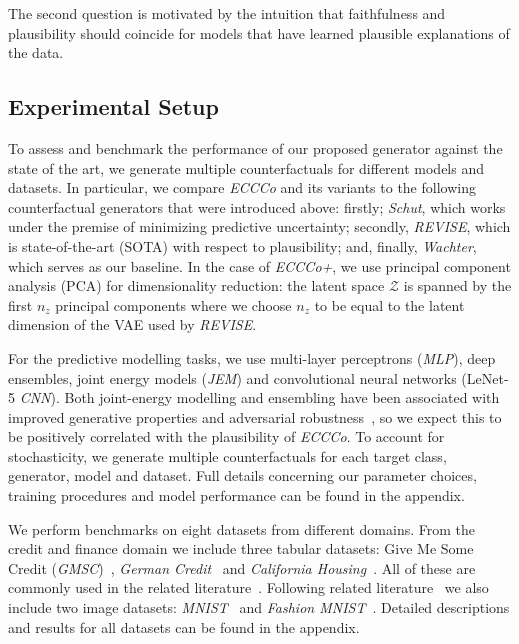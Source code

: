 The second question is motivated by the intuition that faithfulness and plausibility should coincide for models that have learned plausible explanations of the data.

\subsection{Experimental Setup}\label{emp:setup}

To assess and benchmark the performance of our proposed generator against the state of the art, we generate multiple counterfactuals for different models and datasets. In particular, we compare \textit{ECCCo} and its variants to the following counterfactual generators that were introduced above: firstly; \textit{Schut}, which works under the premise of minimizing predictive uncertainty; secondly, \textit{REVISE}, which is state-of-the-art (SOTA) with respect to plausibility; and, finally, \textit{Wachter}, which serves as our baseline. In the case of \textit{ECCCo+}, we use principal component analysis (PCA) for dimensionality reduction: the latent space $\mathcal{Z}$ is spanned by the first $n_z$ principal components where we choose $n_z$ to be equal to the latent dimension of the VAE used by \textit{REVISE}.

For the predictive modelling tasks, we use multi-layer perceptrons (\textit{MLP}), deep ensembles, joint energy models (\textit{JEM}) and convolutional neural networks (LeNet-5 \textit{CNN}). Both joint-energy modelling and ensembling have been associated with improved generative properties and adversarial robustness~\citep{grathwohl2020your,lakshminarayanan2016simple}, so we expect this to be positively correlated with the plausibility of \textit{ECCCo}. To account for stochasticity, we generate multiple counterfactuals for each target class, generator, model and dataset. Full details concerning our parameter choices, training procedures and model performance can be found in the appendix.

We perform benchmarks on eight datasets from different domains. From the credit and finance domain we include three tabular datasets: Give Me Some Credit (\textit{GMSC})~\citep{kaggle2011give}, \textit{German Credit}~\citet{hoffman1994german} and \textit{California Housing}~\citet{pace1997sparse}. All of these are commonly used in the related literature~\citep{karimi2020survey,altmeyer2023endogenous,pawelczyk2021carla}. Following related literature~\citep{schut2021generating,dhurandhar2018explanations} we also include two image datasets: \textit{MNIST}~\citep{lecun1998mnist} and \textit{Fashion MNIST}~\citep{xiao2017fashion}. Detailed descriptions and results for all datasets can be found in the appendix. 

